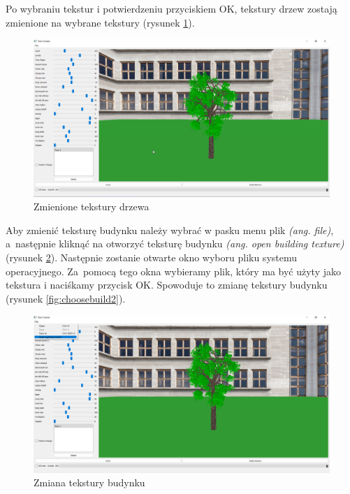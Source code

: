 \documentclass[a4paper,twoside,12pt]{report}
\begin{document}
Po wybraniu tekstur i potwierdzeniu przyciskiem OK, 
tekstury drzew zostają zmienione na wybrane 
tekstury (rysunek \ref{fig:texchoosewin2}).

\begin{figure}[H]
	\centering\includegraphics[width=12cm]{grafika/program/texture3.png}
	\caption{Zmienione tekstury drzewa}
    \label{fig:texchoosewin2}
\end{figure}

Aby zmienić teksturę budynku należy wybrać w pasku menu plik 
\textit{(ang. file)}, a~następnie kliknąć na otworzyć 
teksturę budynku \textit{(ang. open building texture)} (rysunek \ref{fig:choosebuild}).
Następnie zostanie otwarte okno wyboru pliku systemu operacyjnego. 
Za~pomocą tego okna wybieramy plik, który ma być użyty 
jako tekstura i naciśkamy przycisk OK. 
Spowoduje to zmianę tekstury budynku (rysunek \ref{fig:choosebuild2}).

\begin{figure}[H]
	\centering\includegraphics[width=15.5cm]{grafika/program/texture4.png}
	\caption{Zmiana tekstury budynku}
    \label{fig:choosebuild}
\end{figure}
\end{document}

